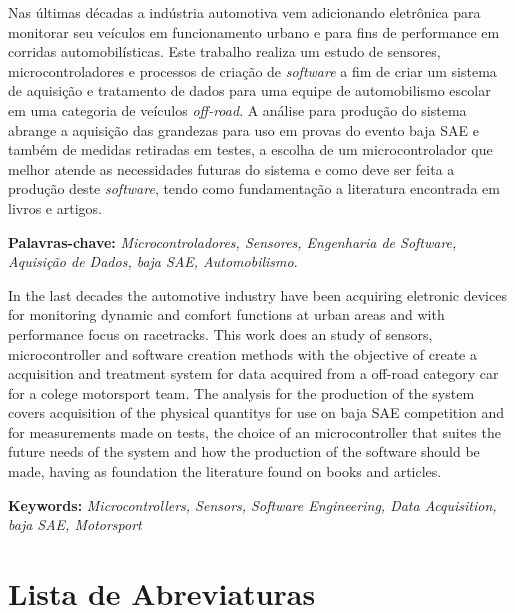 


\noindent Nas últimas décadas a indústria automotiva vem adicionando eletrônica para monitorar seu veículos em funcionamento urbano e para fins de performance em corridas automobilísticas. Este trabalho realiza um estudo de sensores, microcontroladores e processos de criação de \textit{software} a fim de criar um sistema de aquisição e tratamento de dados para uma equipe de automobilismo escolar em uma categoria de veículos \textit{off-road}. A análise para produção do sistema abrange a aquisição das grandezas para uso em provas do evento baja SAE e também de medidas retiradas em testes, a escolha de um microcontrolador que melhor atende as necessidades futuras do sistema e como deve ser feita a produção deste \textit{software}, tendo como fundamentação a literatura encontrada em livros e artigos.  

\textbf{Palavras-chave:} \textit{Microcontroladores, Sensores, Engenharia de Software, Aquisição de Dados, baja SAE, Automobilismo}.



\noindent In the last decades the automotive industry have been acquiring eletronic devices for monitoring dynamic and comfort functions at urban areas and with performance focus on racetracks. This work does an study of sensors, microcontroller and software creation methods with the objective of create a acquisition and treatment system for data acquired from a off-road category car for a colege motorsport team. The analysis for the production of the system covers acquisition of the physical quantitys for use on baja SAE competition and for measurements made on tests, the choice of an microcontroller that suites the future needs of the system and how the production of the software should be made, having as foundation the literature found on books and articles.   


\noindent \textbf{Keywords:} \textit{Microcontrollers, Sensors, Software Engineering, Data Acquisition, baja SAE, Motorsport} 

\tableofcontents
\listoffigures
\listoftables
\newpage
\chapter*{Lista de Abreviaturas\hfill} 
\listofsymbols

\newpage
\pagestyle{myheadings}
